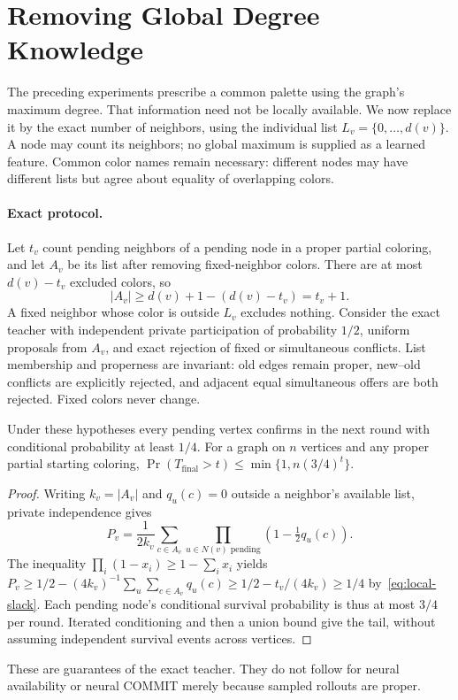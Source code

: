 \section{Removing Global Degree Knowledge}
\label{sec:local-palettes}
The preceding experiments prescribe a common palette using the graph's maximum
degree. That information need not be locally available. We now replace it by
the exact number of neighbors, using the individual list
$L_v=\{0,\ldots,d(v)\}$. A node may count its neighbors; no global maximum is
supplied as a learned feature. Common color names remain necessary: different
nodes may have different lists but agree about equality of overlapping colors.

\paragraph{Exact protocol.}
Let $t_v$ count pending neighbors of a pending node in a proper partial coloring,
and let $A_v$ be its list after removing fixed-neighbor colors. There are at most
$d(v)-t_v$ excluded colors, so
\begin{equation}
 |A_v|\ge d(v)+1-(d(v)-t_v)=t_v+1.\label{eq:local-slack}
\end{equation}
A fixed neighbor whose color is outside $L_v$ excludes nothing. Consider the
exact teacher with independent private participation of probability $1/2$,
uniform proposals from $A_v$, and exact rejection of fixed or simultaneous
conflicts. List membership and properness are invariant: old edges remain
proper, new--old conflicts are explicitly rejected, and adjacent equal
simultaneous offers are both rejected. Fixed colors never change.

\begin{proposition}
Under these hypotheses every pending vertex confirms in the next round with
conditional probability at least $1/4$. For a graph on $n$ vertices and any
proper partial starting coloring,
$\Pr(T_{\mathrm{final}}>t)\le\min\{1,n(3/4)^t\}$.
\end{proposition}
\begin{proof}
Writing $k_v=|A_v|$ and $q_u(c)=0$ outside a neighbor's available list, private
independence gives
\[
 P_v=\frac1{2k_v}\sum_{c\in A_v}
       \prod_{u\in N(v)\text{ pending}}(1-\tfrac12q_u(c)).
\]
The inequality $\prod_i(1-x_i)\ge1-\sum_i x_i$ yields
$P_v\ge1/2-(4k_v)^{-1}\sum_u\sum_{c\in A_v}q_u(c)
\ge1/2-t_v/(4k_v)\ge1/4$ by~\eqref{eq:local-slack}.
Each pending node's conditional survival probability is thus at most $3/4$
per round. Iterated conditioning and then a union bound give the tail, without
assuming independent survival events across vertices.
\end{proof}
These are guarantees of the exact teacher. They do not follow for neural
availability or neural COMMIT merely because sampled rollouts are proper.

